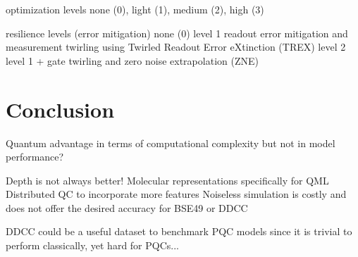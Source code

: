 \documentclass[journal=jacsat,manuscript=article]{achemso}
\begin{document}
optimization levels
none (0), light (1), medium (2), high (3)


resilience levels (error mitigation)
none (0) 
level 1 readout error mitigation and measurement twirling using Twirled Readout Error eXtinction (TREX) \cite{van_den_berg_model-free_2022}
level 2 level 1 + gate twirling and zero noise extrapolation (ZNE)\cite{kandala_error_2019,li_efficient_2017,temme_error_2017}

\section{Conclusion}
Quantum advantage in terms of computational complexity but not in model performance?


Depth is not always better!
Molecular representations specifically for QML
Distributed QC to incorporate more features
Noiseless simulation is costly and does not offer the desired accuracy for BSE49 or DDCC

DDCC could be a useful dataset to benchmark PQC models since it is trivial to perform classically, yet hard for PQCs...


\end{document}
